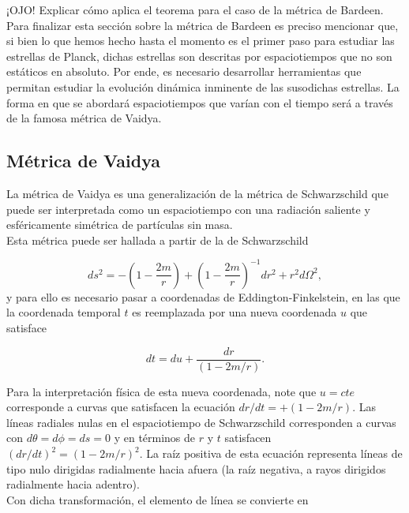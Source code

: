 \documentclass{article}
\numberwithin{equation}{section}
\theoremstyle{definition}
\begin{document}
¡OJO! Explicar cómo aplica el teorema para el caso de la métrica de Bardeen.\\

Para finalizar esta sección sobre la métrica de Bardeen es preciso mencionar que, si bien lo que hemos hecho hasta el momento es el primer paso para estudiar las estrellas de Planck, dichas estrellas son descritas por espaciotiempos que no son estáticos en absoluto. Por ende, es necesario desarrollar herramientas que permitan estudiar la evolución dinámica inminente de las susodichas estrellas. La forma en que se abordará espaciotiempos que varían con el tiempo será a través de la famosa métrica de Vaidya.

\subsection{Métrica de Vaidya}

La métrica de Vaidya \cite{padmanabhan} es una generalización de la métrica de Schwarzschild que puede ser interpretada como un espaciotiempo con una radiación saliente y esféricamente simétrica de partículas sin masa.\\

Esta métrica puede ser hallada a partir de la de Schwarzschild 

\begin{equation}
ds^2 = -\left( 1 - \frac{2m}{r} \right) + \left( 1 - \frac{2m}{r} \right)^{-1}dr^2 + r^2d\Omega^2,
\end{equation}
y para ello es necesario pasar a coordenadas de Eddington-Finkelstein, en las que la coordenada temporal $t$ es reemplazada por una nueva coordenada $u$ que satisface

\begin{equation}
\label{tortoise}
dt = du + \frac{dr}{(1 - 2m/r)}.
\end{equation}

Para la interpretación física de esta nueva coordenada, note que $u = cte$ corresponde a curvas que satisfacen la ecuación $dr/dt = +\left( 1 -2m/r \right)$. Las líneas radiales nulas en el espaciotiempo de Schwarzschild corresponden a curvas con $d\theta = d\phi = ds = 0$ y en términos de $r$ y $t$ satisfacen $(dr/dt)^2 = \left( 1 -2m/r \right)^2$. La raíz positiva de esta ecuación representa líneas de tipo nulo dirigidas radialmente hacia afuera (la raíz negativa, a rayos dirigidos radialmente hacia adentro).\\

Con dicha transformación, el elemento de línea se convierte en 
\end{document}
